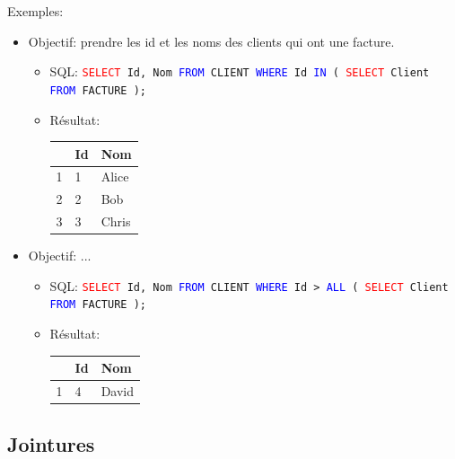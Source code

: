 \documentclass[a4paper]{article}
\begin{document}
Exemples:
\begin{itemize}



\item Objectif: prendre les id et les noms des clients qui ont une facture.
\begin{itemize}
    \item SQL: \texttt{\textcolor{red}{SELECT} Id, Nom \textcolor{blue}{FROM} CLIENT \textcolor{blue}{WHERE} Id \textcolor{blue}{IN} ( \textcolor{red}{SELECT} Client \textcolor{blue}{FROM} FACTURE );}
    \item Résultat:
    \begin{center}
        \begin{tabular}{|l|l|l|} \hline
            & Id & Nom \\ \hline
            1 & 1 & Alice \\ \hline
            2 & 2 &   Bob \\ \hline
            3 & 3 & Chris \\ \hline
        \end{tabular}
    \end{center}
\end{itemize}



\item Objectif: ...
\begin{itemize}
    \item SQL: \texttt{\textcolor{red}{SELECT} Id, Nom \textcolor{blue}{FROM} CLIENT \textcolor{blue}{WHERE} Id > \textcolor{blue}{ALL} ( \textcolor{red}{SELECT} Client \textcolor{blue}{FROM} FACTURE );}
    \item Résultat:
    \begin{center}
        \begin{tabular}{|l|l|l|} \hline
            & Id & Nom \\ \hline
            1 & 4 & David \\ \hline
        \end{tabular}
    \end{center}
\end{itemize}



\end{itemize}










\subsection{Jointures}
\end{document}
